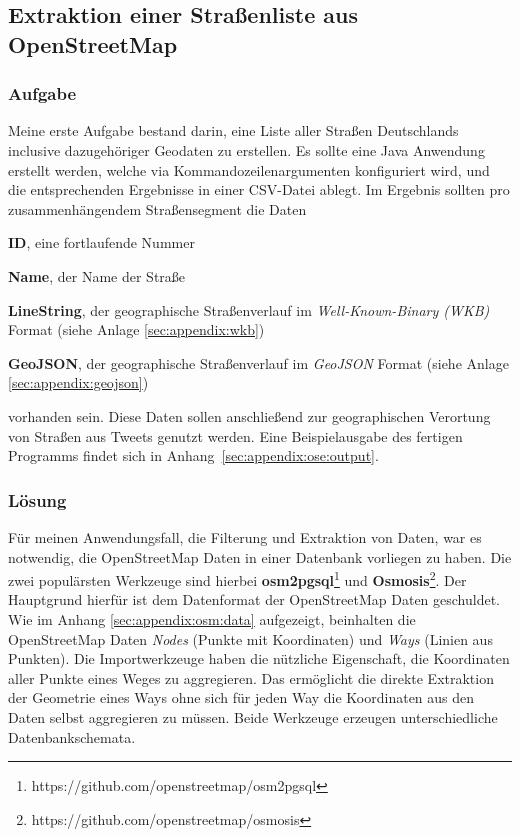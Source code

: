 \subsection{Extraktion einer Straßenliste aus OpenStreetMap}

\subsubsection{Aufgabe}
Meine erste Aufgabe bestand darin, eine Liste aller Straßen Deutschlands inclusive dazugehöriger Geodaten zu erstellen.
Es sollte eine Java Anwendung erstellt werden, welche via Kommandozeilenargumenten konfiguriert wird, und die entsprechenden Ergebnisse in einer CSV-Datei ablegt.
Im Ergebnis sollten pro zusammenhängendem Straßensegment die Daten
\begin{compactitem}
  \item \textbf{ID}, eine fortlaufende Nummer
  \item \textbf{Name}, der Name der Straße
  \item \textbf{LineString}, der geographische Straßenverlauf im \textit{Well-Known-Binary (WKB)} Format (siehe Anlage \ref{sec:appendix:wkb})
  \item \textbf{GeoJSON}, der geographische Straßenverlauf im \textit{GeoJSON} Format (siehe Anlage \ref{sec:appendix:geojson})
\end{compactitem}
vorhanden sein.
Diese Daten sollen anschließend zur geographischen Verortung von Straßen aus Tweets genutzt werden.
Eine Beispielausgabe des fertigen Programms findet sich in Anhang~\ref{sec:appendix:ose:output}.

\subsubsection{Lösung}
Für meinen Anwendungsfall, die Filterung und Extraktion von Daten, war es notwendig, die OpenStreetMap Daten in einer Datenbank vorliegen zu haben.
Die zwei populärsten Werkzeuge sind hierbei \textbf{osm2pgsql}\footnote{https://github.com/openstreetmap/osm2pgsql} und \textbf{Osmosis}\footnote{https://github.com/openstreetmap/osmosis}.
Der Hauptgrund hierfür ist dem Datenformat der OpenStreetMap Daten geschuldet. Wie im Anhang \ref{sec:appendix:osm:data} aufgezeigt, beinhalten die OpenStreetMap Daten \textit{Nodes} (Punkte mit Koordinaten) und \textit{Ways} (Linien aus Punkten). Die Importwerkzeuge haben die nützliche Eigenschaft, die Koordinaten aller Punkte eines Weges zu aggregieren.
Das ermöglicht die direkte Extraktion der Geometrie eines Ways ohne sich für jeden Way die Koordinaten aus den Daten selbst aggregieren zu müssen.
Beide Werkzeuge erzeugen unterschiedliche Datenbankschemata.

